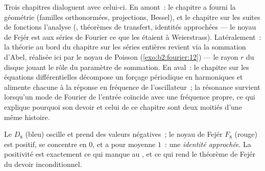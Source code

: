 \begin{remark}
Trois chapitres dialoguent avec celui-ci. En amont~: le chapitre
 a fourni la géométrie (familles orthonormées, projections,
Bessel), et le chapitre sur les suites de fonctions l'analyse
(, théorèmes de transfert, identités approchées
--- le noyau de Fejér est aux séries de Fourier ce que les  étaient à Weierstrass). Latéralement~: la théorie au bord
du chapitre sur les séries entières revient via la sommation d'Abel,
réalisée ici par le noyau de Poisson (\cref{exo:b2:fourier:12}) --- le
rayon $r$ du disque jouant le rôle du paramètre de sommation. En
aval~: le chapitre sur les équations différentielles décompose un
forçage périodique en harmoniques et alimente chacune à la réponse en
fréquence de l'oscillateur~; la résonance survient lorsqu'un mode de
Fourier de l'entrée coïncide avec une fréquence propre, ce qui
explique pourquoi son devoir et celui de ce chapitre sont deux
moitiés d'une même histoire.
\end{remark}

\begin{omfigure}

{\small Le  $D_8$ (bleu) oscille et prend des
valeurs négatives~; le noyau de Fejér $F_8$ (rouge) est positif, se
concentre en $0$, et a pour moyenne $1$~: une \emph{identité
approchée}. La positivité est exactement ce qui manque au , et ce qui rend le théorème de Fejér du devoir
inconditionnel.}
\end{omfigure}

